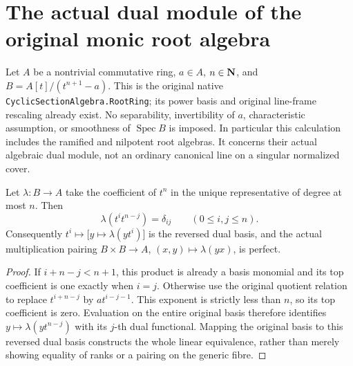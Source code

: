 \section{The actual dual module of the original monic root algebra}
\label{sec:kn-nadel-finite-duality}

Let $A$ be a nontrivial commutative ring, $a\in A$, $n\in\mathbf{N}$, and
$B=A[t]/(t^{n+1}-a)$.  This is the original native
\texttt{CyclicSectionAlgebra.RootRing}; its power basis and original
line-frame rescaling already exist.  No separability, invertibility
of $a$, characteristic assumption, or smoothness of $\operatorname{Spec}B$
is imposed.  In particular this calculation includes the ramified
and nilpotent root algebras.  It concerns their actual algebraic
dual module, not an ordinary canonical line on a singular normalized
cover.

\begin{lemma}
\label{lem:kn-nadel-root-top-pairing}
\leanok
Let $\lambda:B\to A$ take the coefficient of $t^n$ in the unique
representative of degree at most $n$.  Then
\[
 \lambda(t^i t^{n-j})=\delta_{ij}\qquad(0\leq i,j\leq n).
\]
Consequently $t^i\mapsto\bigl[y\mapsto\lambda(yt^i)\bigr]$
is the reversed dual basis, and the actual multiplication pairing
$B\times B\to A$, $(x,y)\mapsto\lambda(yx)$, is perfect.
\end{lemma}
\begin{proof}
If $i+n-j<n+1$, this product is already a basis monomial and its
top coefficient is one exactly when $i=j$.  Otherwise use the
original quotient relation to replace $t^{i+n-j}$ by
$a t^{i-j-1}$.  This exponent is strictly less than $n$, so its top
coefficient is zero.  Evaluation on the entire original basis
therefore identifies $y\mapsto\lambda(yt^{n-j})$ with its $j$-th
dual functional.  Mapping the original basis to this reversed dual
basis constructs the whole linear equivalence, rather than merely
showing equality of ranks or a pairing on the generic fibre.
\end{proof}

